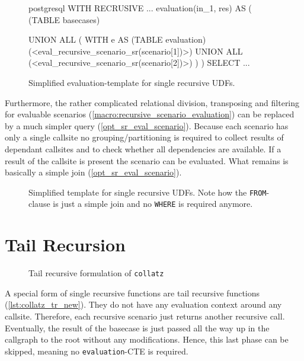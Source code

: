 \begin{figure}[h!]
    \centering
    \begin{cminted}{postgresql}
WITH RECRUSIVE
    ...
    evaluation(in_1, res) AS (
        (TABLE basecases)
        
        UNION ALL (
            WITH e AS (TABLE evaluation)
            (<eval_recursive_scenario_sr(scenario[1])>)
               UNION ALL
            (<eval_recursive_scenario_sr(scenario[2])>)
        )
    )
SELECT ...
    \end{cminted}
    \caption{Simplified evaluation-template for single recursive UDFs.}
    \label{opt_sr_evaluation_cte}
\end{figure}

Furthermore, the rather complicated relational division, transposing and filtering for evaluable scenarios (\autoref{macro:recursive_scenario_evaluation}) can be replaced by a much simpler query (\autoref{opt_sr_eval_scenario}). Because each scenario has only a single callsite no grouping/partitioning is required to collect results of dependant callsites and to check whether all dependencies are available. If a result of the callsite is present the scenario can be evaluated. What remains is basically a simple join (\autoref{opt_sr_eval_scenario}).

\begin{figure}[h!]
    \centering
    \caption{Simplified template for single recursive UDFs. Note how the \texttt{FROM}-clause is just a simple join and no \texttt{WHERE} is required anymore.}
    \label{opt_sr_eval_scenario}
\end{figure}



\section{Tail Recursion}

\begin{wrapfigure}{r}{0.6\textwidth}
  \vspace{-10pt}
  \caption{Tail recursive formulation of \texttt{collatz}}
  \label{lst:collatz_tr_new}
\end{wrapfigure}

A special form of single recursive functions are tail recursive functions (\autoref{lst:collatz_tr_new}). They do not have any evaluation context around any callsite. Therefore, each recursive scenario just returns another recursive call. Eventually, the result of the basecase is just passed all the way up in the callgraph to the root without any modifications. Hence, this last phase can be skipped, meaning no \texttt{evaluation}-CTE is required.


